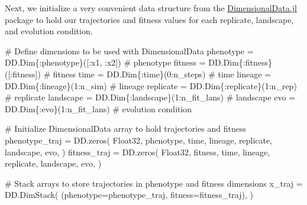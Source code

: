 \documentclass[
]{scrartcl}
\newenvironment{Shaded}{\begin{snugshade}}{\end{snugshade}}
\newcommand{\CommentTok}[1]{\textcolor[rgb]{0.37,0.37,0.37}{#1}}
\newcommand{\DataTypeTok}[1]{\textcolor[rgb]{0.68,0.00,0.00}{#1}}
\newcommand{\FloatTok}[1]{\textcolor[rgb]{0.68,0.00,0.00}{#1}}
\newcommand{\FunctionTok}[1]{\textcolor[rgb]{0.28,0.35,0.67}{#1}}
\newcommand{\NormalTok}[1]{\textcolor[rgb]{0.00,0.23,0.31}{#1}}
\newcommand{\OperatorTok}[1]{\textcolor[rgb]{0.37,0.37,0.37}{#1}}
\begin{document}
Next, we initialize a very convenient data structure from the
\href{https://rafaqz.github.io/DimensionalData.jl/v0.29.15/}{DimensionalData.jl}
package to hold our trajectories and fitness values for each replicate,
landscape, and evolution condition.

\begin{Shaded}
\begin{Highlighting}[]
\CommentTok{\# Define dimensions to be used with DimensionalData}
\NormalTok{phenotype }\OperatorTok{=}\NormalTok{ DD.}\FunctionTok{Dim}\DataTypeTok{\{:phenotype\}}\NormalTok{([}\OperatorTok{:}\NormalTok{x1, }\OperatorTok{:}\NormalTok{x2]) }\CommentTok{\# phenotype}
\NormalTok{fitness }\OperatorTok{=}\NormalTok{ DD.}\FunctionTok{Dim}\DataTypeTok{\{:fitness\}}\NormalTok{([}\OperatorTok{:}\NormalTok{fitness]) }\CommentTok{\# fitness}
\NormalTok{time }\OperatorTok{=}\NormalTok{ DD.}\FunctionTok{Dim}\DataTypeTok{\{:time\}}\NormalTok{(}\FloatTok{0}\OperatorTok{:}\NormalTok{n\_steps) }\CommentTok{\# time}
\NormalTok{lineage }\OperatorTok{=}\NormalTok{ DD.}\FunctionTok{Dim}\DataTypeTok{\{:lineage\}}\NormalTok{(}\FloatTok{1}\OperatorTok{:}\NormalTok{n\_sim) }\CommentTok{\# lineage}
\NormalTok{replicate }\OperatorTok{=}\NormalTok{ DD.}\FunctionTok{Dim}\DataTypeTok{\{:replicate\}}\NormalTok{(}\FloatTok{1}\OperatorTok{:}\NormalTok{n\_rep) }\CommentTok{\# replicate}
\NormalTok{landscape }\OperatorTok{=}\NormalTok{ DD.}\FunctionTok{Dim}\DataTypeTok{\{:landscape\}}\NormalTok{(}\FloatTok{1}\OperatorTok{:}\NormalTok{n\_fit\_lans) }\CommentTok{\# landscape}
\NormalTok{evo }\OperatorTok{=}\NormalTok{ DD.}\FunctionTok{Dim}\DataTypeTok{\{:evo\}}\NormalTok{(}\FloatTok{1}\OperatorTok{:}\NormalTok{n\_fit\_lans) }\CommentTok{\# evolution condition}

\CommentTok{\# Initialize DimensionalData array to hold trajectories and fitness}
\NormalTok{phenotype\_traj }\OperatorTok{=}\NormalTok{ DD.}\FunctionTok{zeros}\NormalTok{(}
    \DataTypeTok{Float32}\NormalTok{,}
\NormalTok{    phenotype,}
\NormalTok{    time,}
\NormalTok{    lineage,}
\NormalTok{    replicate,}
\NormalTok{    landscape,}
\NormalTok{    evo,}
\NormalTok{)}
\NormalTok{fitness\_traj }\OperatorTok{=}\NormalTok{ DD.}\FunctionTok{zeros}\NormalTok{(}
    \DataTypeTok{Float32}\NormalTok{,}
\NormalTok{    fitness,}
\NormalTok{    time,}
\NormalTok{    lineage,}
\NormalTok{    replicate,}
\NormalTok{    landscape,}
\NormalTok{    evo,}
\NormalTok{)}

\CommentTok{\# Stack arrays to store trajectories in phenotype and fitness dimensions}
\NormalTok{x\_traj }\OperatorTok{=}\NormalTok{ DD.}\FunctionTok{DimStack}\NormalTok{(}
\NormalTok{    (phenotype}\OperatorTok{=}\NormalTok{phenotype\_traj, fitness}\OperatorTok{=}\NormalTok{fitness\_traj),}
\NormalTok{)}


\end{Highlighting}
\end{Shaded}
\end{document}
